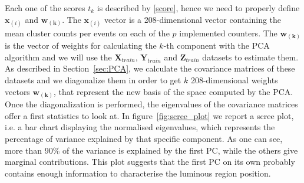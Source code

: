 Each one of the scores $t_k$ is described by \eqref{score}, hence we need to properly define $\mathbf{x}_{(i)}$ and $\mathbf{w_{(k)}}$. The $\mathbf{x}_{(i)}$ vector is a 208-dimensional vector containing the mean cluster counts per events on each of the $p$ implemented counters. The  $\mathbf{w_{(k)}}$ is the vector of weights for calculating the $k$-th component with the PCA algorithm and we will use the $\mathbf{X}_{train}$, $\mathbf{Y}_{train}$ and $\mathbf{Z}_{train}$ datasets to estimate them. As described in Section~\ref{sec:PCA}, we calculate the covariance matrices of these datasets and we diagonalize them in order to get $k$ 208-dimensional weights vectors $\mathbf{w_{(k)}}$, that represent the new basis of the space computed by the PCA. 
Once the diagonalization is performed, the eigenvalues of the covariance matrices offer a first statistics to look at. In figure~\ref{fig:scree_plot} we report a scree plot, i.e. a bar chart displaying the normalised eigenvalues, which represents the percentage of variance explained by that specific component. As one can see, more than 90\% of the variance is explained by the first PC, while the others give marginal contributions. This plot suggests that the first PC on its own probably contains enough information to characterise the luminous region position.
